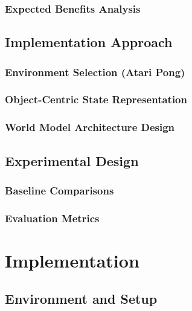 \documentclass[
	english,
	ruledheaders=section,
	class=report,
	thesis={type=master},
	accentcolor=9c,
	custommargins=true,
	marginpar=false,
	parskip=half-,
	fontsize=11pt,
]{tudapub}
\begin{document}
\subsection{Expected Benefits Analysis}
\label{subsec:benefits_analysis}

\section{Implementation Approach}
\label{sec:implementation_approach}

\subsection{Environment Selection (Atari Pong)}
\label{subsec:env_selection}

\subsection{Object-Centric State Representation}
\label{subsec:state_representation}

\subsection{World Model Architecture Design}
\label{subsec:architecture_design}

\section{Experimental Design}
\label{sec:experimental_design}

\subsection{Baseline Comparisons}
\label{subsec:baselines}

\subsection{Evaluation Metrics}
\label{subsec:metrics}

\chapter{Implementation}
\label{chap:implementation}

\section{Environment and Setup}
\label{sec:environment}
\end{document}
